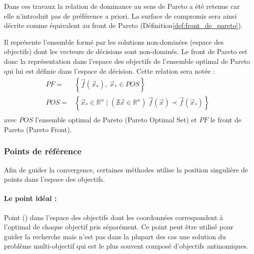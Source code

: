 
Dans ces travaux la relation de dominance au sens de Pareto a été retenue car
elle n’introduit pas de préférence a priori. La surface de compromis sera ainsi
décrite comme équivalent au front de Pareto (Définition\ref{def:front_de_pareto}).


\begin{Def}\label{def:front_de_pareto}
Il représente l’ensemble formé par les solutions non-dominées (espace des objectifs)
dont les vecteurs de décisions sont non-dominés.
Le front de Pareto est donc la représentation dans l’espace des objectifs
de l’ensemble optimal de Pareto qui lui est définie dans l’espace de décision.
Cette relation sera notée :
\begin{equation}
  \begin{aligned}
    PF   =& \left\{ \vec{f}(\vec{x}_{*}), \  \vec{x}_{*} \in POS \right\} \\
    POS  =& \left\{ \vec{x}_{*} \in \mathbb{R}^{n} \mid (\nexists \vec{x} \in \mathbb{R}^{n}) \  \vec{f}(\vec{x}) \prec \vec{f}(\vec{x}_{*}) \right\} \\
  \end{aligned}
\end{equation}
avec $POS$ l’ensemble optimal de Pareto (Pareto Optimal Set) et $PF$ le front de Pareto
(Pareto Front).
\end{Def}


\subsubsection{Points de référence} %
\label{ssub:points_de_reference}
Afin de guider la convergence, certaines méthodes utilise la position singulière
de points dans l’espace des objectifs.
\paragraph{Le point idéal :} %
\label{par:le_point_idéal}
Point () dans l’espace des objectifs dont
les coordonnées correspondent à l’optimal de chaque objectif pris séparément. Ce point
peut être utilisé pour guider la recherche mais n’est pas dans la plupart des cas
une solution du problème multi-objectif qui est le plus souvent composé d’objectifs
antinomiques.

